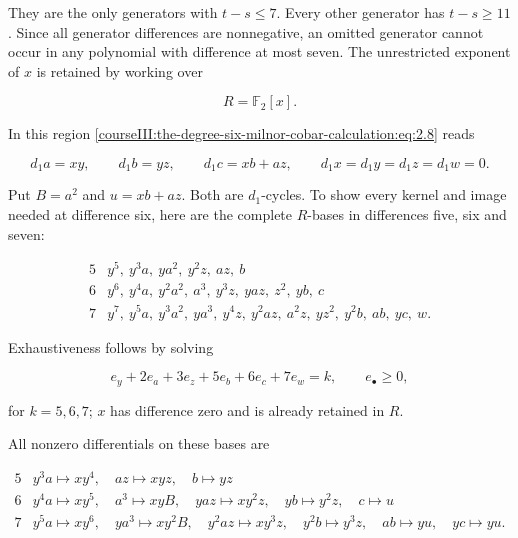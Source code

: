 They are the only generators with \(t-s\leq7\). Every other generator has \(t-s\geq11\). Since all generator differences are nonnegative, an omitted generator cannot occur in any polynomial with difference at most seven. The unrestricted exponent of \(x\) is retained by working over

\begin{equation}
R=\mathbb F _2[x].
 \label{courseIII:the-degree-six-milnor-cobar-calculation:eq:3.2}
\end{equation}

In this region \eqref{courseIII:the-degree-six-milnor-cobar-calculation:eq:2.8} reads

\begin{equation}
d_1a=xy,\qquad d_1b=yz,\qquad d_1c=xb+az,\qquad
 d_1x=d_1y=d_1z=d_1w=0.
 \label{courseIII:the-degree-six-milnor-cobar-calculation:eq:3.3}
\end{equation}

Put \(B=a^2\) and \(u=xb+az\). Both are \(d_1\)-cycles. To show every kernel and image needed at difference six, here are the complete \(R\)-bases in differences five, six and seven:

\begin{equation}
\begin{array}{c|l}
5&y^5,\ y^3a,\ ya^2,\ y^2z,\ az,\ b\\
6&y^6,\ y^4a,\ y^2a^2,\ a^3,\ y^3z,\ yaz,\ z^2,\ yb,\ c\\
7&y^7,\ y^5a,\ y^3a^2,\ ya^3,\ y^4z,\ y^2az,\
       a^2z,\ yz^2,\ y^2b,\ ab,\ yc,\ w .
\end{array}
\label{courseIII:the-degree-six-milnor-cobar-calculation:eq:3.4}
\end{equation}

Exhaustiveness follows by solving

\begin{equation}
e_y+2e_a+3e_z+5e_b+6e_c+7e_w=k,\qquad e_\bullet\geq0,
 \label{courseIII:the-degree-six-milnor-cobar-calculation:eq:3.5}
\end{equation}

for \(k=5,6,7\); \(x\) has difference zero and is already retained in \(R\).

All nonzero differentials on these bases are

\begin{equation}
\begin{array}{c|l}
5&
 y^3a\mapsto xy^4,\quad az\mapsto xyz,\quad b\mapsto yz\\
6&
 y^4a\mapsto xy^5,\quad a^3\mapsto xyB,\quad
 yaz\mapsto xy^2z,\quad yb\mapsto y^2z,\quad c\mapsto u\\
7&
 y^5a\mapsto xy^6,\quad ya^3\mapsto xy^2B,\quad
 y^2az\mapsto xy^3z,\quad y^2b\mapsto y^3z,\quad
 ab\mapsto yu,\quad yc\mapsto yu .
\end{array}
\label{courseIII:the-degree-six-milnor-cobar-calculation:eq:3.6}
\end{equation}

